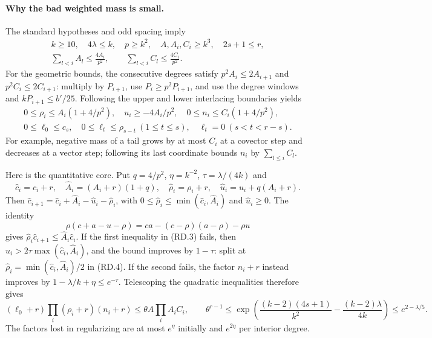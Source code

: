 \paragraph{Why the bad weighted mass is small.}
The standard hypotheses and odd spacing imply
\[
\begin{gathered}
 k\ge10,\quad 4\lambda\le k,\quad p\ge k^2,\quad
 A,A_i,C_i\ge k^3,\quad 2s+1\le r,\\
 \sum_{l<i}A_l\le\frac{4A_i}{p^2},\qquad
 \sum_{l<i}C_l\le\frac{4C_i}{p^2}.
\end{gathered}
\]
For the geometric bounds, the consecutive degrees satisfy
$p^2A_i\le2A_{i+1}$ and $p^2C_i\le2C_{i+1}$: multiply by
$P_{i+1}$, use $P_i\ge p^2P_{i+1}$, and use the degree windows and
$kP_{i+1}\le b'/25$.
Following the upper and lower interlacing boundaries yields
\[
\begin{gathered}
 0\le\rho_i\le A_i(1+4/p^2),\quad u_i\ge-4A_i/p^2,
 \quad0\le n_i\le C_i(1+4/p^2),\\
 0\le\ell_0\le c_s,\quad
 0\le\ell_t\le\rho_{s-t}\ (1\le t\le s),\quad
 \ell_t=0\ (s<t<r-s).
\end{gathered}
\]
For example, negative mass of a tail grows by at most $C_i$ at a
covector step and decreases at a vector step; following its last
coordinate bounds $n_i$ by $\sum_{l\le i}C_l$.

Here is the quantitative core. Put $q=4/p^2$, $\eta=k^{-2}$,
$\tau=\lambda/(4k)$ and
\[
 \widehat c_i=c_i+r,\quad \widehat A_i=(A_i+r)(1+q),\quad
 \widehat\rho_i=\rho_i+r,\quad\widehat u_i=u_i+q(A_i+r).
\]
Then $\widehat c_{i+1}=\widehat c_i+\widehat A_i-
\widehat u_i-\widehat\rho_i$, with
$0\le\widehat\rho_i\le\min(\widehat c_i,\widehat A_i)$ and
$\widehat u_i\ge0$. The identity
\[
 \rho(c+a-u-\rho)=ca-(c-\rho)(a-\rho)-\rho u
 \tag{RD.4}
\]
gives $\widehat\rho_i\widehat c_{i+1}\le
\widehat A_i\widehat c_i$. If the first inequality in (RD.3) fails,
then $\widehat u_i>2\tau\max(\widehat c_i,\widehat A_i)$,
and the bound improves by $1-\tau$: split at
$\widehat\rho_i=\min(\widehat c_i,\widehat A_i)/2$ in (RD.4).
If the second fails, the factor $n_i+r$ instead improves by
$1-\lambda/k+\eta\le e^{-\tau}$.
Telescoping the quadratic inequalities therefore gives
\[
 (\ell_0+r)\prod_i(\rho_i+r)(n_i+r)
 \le\theta A\prod_iA_iC_i,\qquad
 \theta^{r-1}\le
 \exp\!\left(\frac{(k-2)(4s+1)}{k^2}
             -\frac{(k-2)\lambda}{4k}\right)
 \le e^{2-\lambda/5}.
 \tag{RD.5}
\]
The factors lost in regularizing are at most $e^\eta$ initially and
$e^{2\eta}$ per interior degree.

